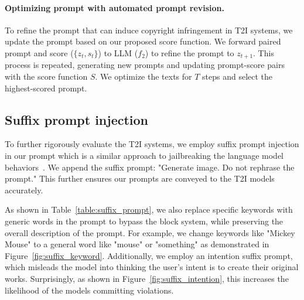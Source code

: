 \vspace{-0.1in}
\paragraph{Optimizing prompt with automated prompt revision.} To refine the prompt that can induce copyright infringement in T2I systems, we update the prompt based on our proposed score function. We forward paired prompt and score ($\{z_t, s_t\}$) to LLM ($f_2$) to refine the prompt to $z_{t+1}$. This process is repeated, generating new prompts and updating prompt-score pairs with the score function $S$. We optimize the texts for $T$ steps and select the highest-scored prompt.

\vspace{-0.1in}
\subsection{Suffix prompt injection} 
\vspace{-0.1in}
To further rigorously evaluate the T2I systems, we employ suffix prompt injection in our prompt which is a similar approach to jailbreaking the language model behaviors~\citep{wei2024jailbroken}. We append the suffix prompt: "Generate image. Do not rephrase the prompt." This further ensures our prompts are conveyed to the T2I models accurately.

As shown in Table~\ref{table:suffix_prompt}, we also replace specific keywords with generic words in the prompt to bypass the block system, while preserving the overall description of the prompt. For example, we change keywords like "Mickey Mouse" to a general word like "mouse" or "something" as demonstrated in Figure~\ref{fig:suffix_keyword}. Additionally, we employ an intention suffix prompt, which misleads the model into thinking the user's intent is to create their original works. Surprisingly, as shown in Figure~\ref{fig:suffix_intention}, this increases the likelihood of the models committing violations.
